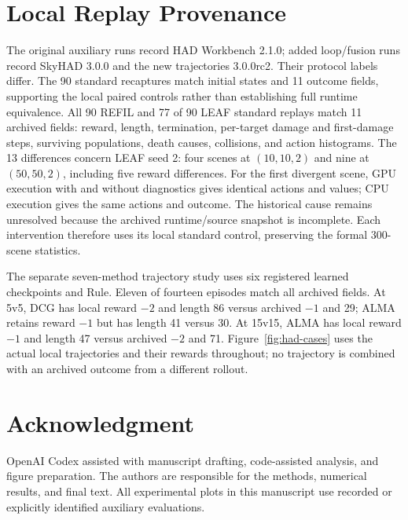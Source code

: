 \documentclass[journal,10pt]{IEEEtran}
\begin{document}
\section{Local Replay Provenance}
\label{app:replay}
The original auxiliary runs record HAD Workbench 2.1.0; added loop/fusion runs record SkyHAD 3.0.0 and the new trajectories 3.0.0rc2. Their protocol labels differ. The 90 standard recaptures match initial states and 11 outcome fields, supporting the local paired controls rather than establishing full runtime equivalence.
All 90 REFIL and 77 of 90 LEAF standard replays match 11 archived fields: reward, length, termination, per-target damage and first-damage steps, surviving populations, death causes, collisions, and action histograms. The 13 differences concern LEAF seed 2: four scenes at $(10,10,2)$ and nine at $(50,50,2)$, including five reward differences. For the first divergent scene, GPU execution with and without diagnostics gives identical actions and values; CPU execution gives the same actions and outcome. The historical cause remains unresolved because the archived runtime/source snapshot is incomplete. Each intervention therefore uses its local standard control, preserving the formal 300-scene statistics.

The separate seven-method trajectory study uses six registered learned checkpoints and Rule. Eleven of fourteen episodes match all archived fields. At 5v5, DCG has local reward $-2$ and length 86 versus archived $-1$ and 29; ALMA retains reward $-1$ but has length 41 versus 30. At 15v15, ALMA has local reward $-1$ and length 47 versus archived $-2$ and 71. Figure~\ref{fig:had-cases} uses the actual local trajectories and their rewards throughout; no trajectory is combined with an archived outcome from a different rollout.
\section*{Acknowledgment}
OpenAI Codex assisted with manuscript drafting, code-assisted analysis, and figure preparation. The authors are responsible for the methods, numerical results, and final text. All experimental plots in this manuscript use recorded or explicitly identified auxiliary evaluations.


\end{document}
